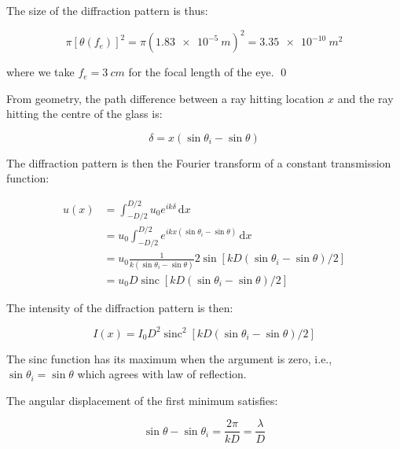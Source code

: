 \documentclass[12pt]{article}
\begin{document}
The size of the diffraction pattern is thus:

\begin{equation}
    \pi [\theta (f_{e})]^{2} = \pi (\qty{1.83e-5}{m})^{2} = \qty{3.35e-10}{m^{2}}
\end{equation}

where we take $f_{e} = \qty{3}{cm}$ for the focal length of the eye.
\qed



From geometry, the path difference between a ray hitting location $x$ and the ray hitting the centre of the glass is:

\begin{equation}
    \delta = x(\sin{\theta_{i}} - \sin{\theta})
\end{equation}

The diffraction pattern is then the Fourier transform of a constant transmission function:

\begin{equation}
    \begin{split}
        u(x) &= \int_{-D/2}^{D/2} u_{0} e^{i k \delta} \, \mathrm{d}x \\
        &= u_{0} \int_{-D/2}^{D/2} e^{i k x (\sin{\theta_{i}} - \sin{\theta})} \, \mathrm{d}x \\
        &= u_{0} \frac{1}{k (\sin{\theta_{i}} - \sin{\theta})} 2 \sin{[kD (\sin{\theta_{i}} - \sin{\theta})/2]} \\
        &= u_{0}D \operatorname{sinc}{\left[ kD (\sin{\theta_{i}} - \sin{\theta})/2 \right]}
    \end{split}
\end{equation}

The intensity of the diffraction pattern is then:

\begin{equation}
    I(x) = I_{0}D^{2} \operatorname{sinc}^{2}{\left[ kD (\sin{\theta_{i}} - \sin{\theta})/2 \right]}
\end{equation}

The sinc function has its maximum when the argument is zero, i.e., $\sin{\theta_{i}} = \sin{\theta}$ which agrees with law of reflection.

The angular displacement of the first minimum satisfies:

\begin{equation}
    \sin{\theta} - \sin{\theta_{i}} = \frac{2\pi}{kD} = \frac{\lambda}{D}
\end{equation}
\end{document}
